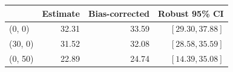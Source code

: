 \begin{center}
\small\renewcommand{\arraystretch}{1.3}
\begin{tabular}{@{}lrrr@{}}\toprule
 & Estimate & Bias-corrected & Robust 95\% CI\\\midrule
(0, 0) & 32.31 & 33.59 & $[29.30, 37.88]$\\
(30, 0) & 31.52 & 32.08 & $[28.58, 35.59]$\\
(0, 50) & 22.89 & 24.74 & $[14.39, 35.08]$\\
\bottomrule\end{tabular}
\end{center}
